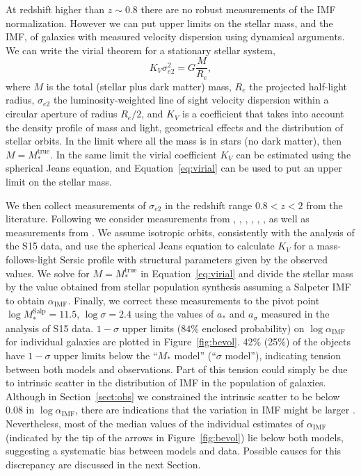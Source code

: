 \documentclass[usenatbib, letters]{mnras}
\def\mtrue{M_*^{\mathrm{true}}}
\def\msalp{M_*^{\mathrm{Salp}}}
\def\aimf{\alpha_{\mathrm{IMF}}}
\def\Sref#1{Section~\ref{#1}\xspace}
\def\Fref#1{Figure~\ref{#1}\xspace}
\def\Eref#1{Equation~\ref{#1}\xspace}
\begin{document}
{%

At redshift higher than $z\sim0.8$ there are no robust measurements of the IMF normalization.
However we can put upper limits on the stellar mass, and the IMF, of galaxies with measured velocity dispersion using dynamical arguments.
We can write the virial theorem for a stationary stellar system,
\begin{equation}\label{eq:virial}
K_V\sigma_{e2}^2 = G\frac{M}{R_e},
\end{equation}
where $M$ is the total (stellar plus dark matter) mass, $R_e$ the projected half-light radius, $\sigma_{e2}$ the luminosity-weighted line of sight velocity dispersion within a circular aperture of radius $R_e/2$, and $K_V$ is a coefficient that takes into account the density profile of mass and light, geometrical effects and the distribution of stellar orbits.
In the limit where all the mass is in stars (no dark matter), then $M=\mtrue$. In the same limit the virial coefficient $K_V$ can be estimated using the spherical Jeans equation, and \Eref{eq:virial} can be used to put an upper limit on the stellar mass.

We then collect measurements of $\sigma_{e2}$ in the redshift range $0.8 < z < 2$ from the literature. Following \citet{Mas++15} we consider measurements from \citet{vdW++08}, \citet{Cap++09}, \citet{New++10}, \citet{Ono++12}, \citet{Bez++13}, \citet{vdS++13}, as well as measurements from \citet{Gar++15}.
We assume isotropic orbits, consistently with the analysis of the S15 data, and use the spherical Jeans equation to calculate $K_V$ for a mass-follows-light Sersic profile with structural parameters given by the observed values.
We solve for $M=\mtrue$ in \Eref{eq:virial} and divide the stellar mass by the value obtained from stellar population synthesis assuming a Salpeter IMF to obtain $\aimf$. 
Finally, we correct these measurements to the pivot point $\log{\msalp}=11.5$, $\log{\sigma}=2.4$ using the values of $a_*$ and $a_\sigma$ measured in the analysis of S15 data.
$1-\sigma$ upper limits ($84\%$ enclosed probability) on $\log{\aimf}$ for individual galaxies are plotted in \Fref{fig:bevol}.
42\% (25\%) of the objects have $1-\sigma$ upper limits below the ``$M_*$ model'' (``$\sigma$ model''), indicating tension between both models and observations.
Part of this tension could simply be due to intrinsic scatter in the distribution of IMF in the population of galaxies.
Although in \Sref{sect:obs} we constrained the intrinsic scatter to be below $0.08$ in $\log{\aimf}$, there are indications that the variation in IMF might be larger \citep{S+L13}. Nevertheless, most of the median values of the individual estimates of $\aimf$ (indicated by the tip of the arrows in \Fref{fig:bevol}) lie below both models, suggesting a systematic bias between models and data.
Possible causes for this discrepancy are discussed in the next Section.
}
\end{document}

